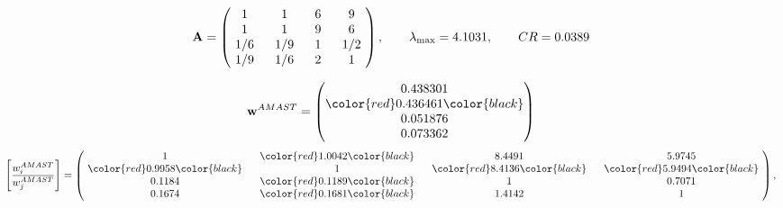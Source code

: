 \begin{example}
\begin{equation*}
\mathbf{A} =
\begin{pmatrix}
$\,\,$ 1 $\,\,$ & $\,\,$1$\,\,$ & $\,\,$6$\,\,$ & $\,\,$9 $\,\,$ \\
$\,\,$ 1 $\,\,$ & $\,\,$ 1 $\,\,$ & $\,\,$9$\,\,$ & $\,\,$6 $\,\,$ \\
$\,\,$ 1/6$\,\,$ & $\,\,$ 1/9$\,\,$ & $\,\,$ 1 $\,\,$ & $\,\,$ 1/2 $\,\,$ \\
$\,\,$ 1/9$\,\,$ & $\,\,$ 1/6$\,\,$ & $\,\,$2$\,\,$ & $\,\,$ 1  $\,\,$ \\
\end{pmatrix},
\qquad
\lambda_{\max} =
4.1031,
\qquad
CR = 0.0389
\end{equation*}

\begin{equation*}
\mathbf{w}^{AMAST} =
\begin{pmatrix}
0.438301\\
\color{red} 0.436461\color{black} \\
0.051876\\
0.073362
\end{pmatrix}\end{equation*}
\begin{equation*}
\left[ \frac{{w}^{AMAST}_i}{{w}^{AMAST}_j} \right] =
\begin{pmatrix}
$\,\,$ 1 $\,\,$ & $\,\,$\color{red} 1.0042\color{black} $\,\,$ & $\,\,$8.4491$\,\,$ & $\,\,$5.9745$\,\,$ \\
$\,\,$\color{red} 0.9958\color{black} $\,\,$ & $\,\,$ 1 $\,\,$ & $\,\,$\color{red} 8.4136\color{black} $\,\,$ & $\,\,$\color{red} 5.9494\color{black}   $\,\,$ \\
$\,\,$0.1184$\,\,$ & $\,\,$\color{red} 0.1189\color{black} $\,\,$ & $\,\,$ 1 $\,\,$ & $\,\,$0.7071 $\,\,$ \\
$\,\,$0.1674$\,\,$ & $\,\,$\color{red} 0.1681\color{black} $\,\,$ & $\,\,$1.4142$\,\,$ & $\,\,$ 1  $\,\,$ \\
\end{pmatrix},
\end{equation*}


\end{example}
